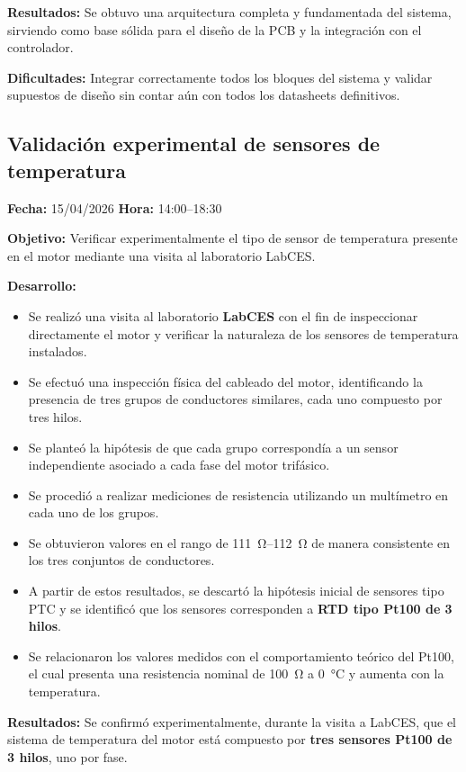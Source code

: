 \documentclass[12pt]{article}
\begin{document}
\textbf{Resultados:}
Se obtuvo una arquitectura completa y fundamentada del sistema, sirviendo como base sólida para el diseño de la PCB y la integración con el controlador.

\textbf{Dificultades:}
Integrar correctamente todos los bloques del sistema y validar supuestos de diseño sin contar aún con todos los datasheets definitivos.

\subsection{Validación experimental de sensores de temperatura}
\textbf{Fecha:} 15/04/2026 \quad \textbf{Hora:} 14:00--18:30

\textbf{Objetivo:}
Verificar experimentalmente el tipo de sensor de temperatura presente en el motor mediante una visita al laboratorio LabCES.

\textbf{Desarrollo:}
\begin{itemize}
\item Se realizó una visita al laboratorio \textbf{LabCES} con el fin de inspeccionar directamente el motor y verificar la naturaleza de los sensores de temperatura instalados.
\item Se efectuó una inspección física del cableado del motor, identificando la presencia de tres grupos de conductores similares, cada uno compuesto por tres hilos.
\item Se planteó la hipótesis de que cada grupo correspondía a un sensor independiente asociado a cada fase del motor trifásico.
\item Se procedió a realizar mediciones de resistencia utilizando un multímetro en cada uno de los grupos.
\item Se obtuvieron valores en el rango de \SIrange{111}{112}{\ohm} de manera consistente en los tres conjuntos de conductores.
\item A partir de estos resultados, se descartó la hipótesis inicial de sensores tipo PTC y se identificó que los sensores corresponden a \textbf{RTD tipo Pt100 de 3 hilos}.
\item Se relacionaron los valores medidos con el comportamiento teórico del Pt100, el cual presenta una resistencia nominal de \SI{100}{\ohm} a \SI{0}{\celsius} y aumenta con la temperatura.
\end{itemize}

\textbf{Resultados:}
Se confirmó experimentalmente, durante la visita a LabCES, que el sistema de temperatura del motor está compuesto por \textbf{tres sensores Pt100 de 3 hilos}, uno por fase.
\end{document}
